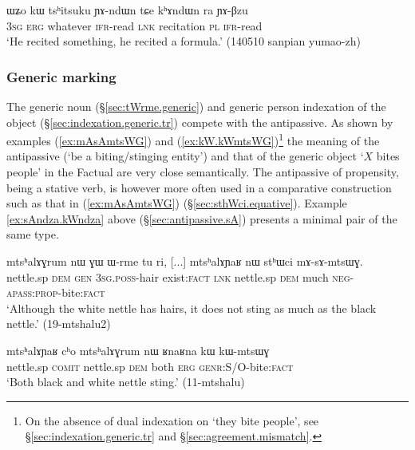 \begin{exe}
\ex \label{ex:tshitsuku.YAndWn}
\gll ɯʑo kɯ tsʰitsuku ɲɤ-ndɯn tɕe kʰɤndɯn ra ɲɤ-βzu \\
\textsc{3sg} \textsc{erg} whatever \textsc{ifr}-read \textsc{lnk} recitation \textsc{pl} \textsc{ifr}-read \\
\glt `He recited something, he recited a formula.' (140510 sanpian yumao-zh)
\end{exe}

\subsubsection{Generic marking  } \label{sec:antipassive.vs.generic}
The generic noun  (§\ref{sec:tWrme.generic}) and generic person indexation of the object (§\ref{sec:indexation.generic.tr}) compete with the  antipassive. As shown by examples (\ref{ex:mAsAmtsWG}) and (\ref{ex:kW.kWmtsWG})\footnote{On the absence of dual indexation on  `they bite people', see §\ref{sec:indexation.generic.tr} and §\ref{sec:agreement.mismatch}. } the meaning of the antipassive  (`be a biting/stinging entity') and that of the generic object  `$X$ bites people' in the Factual are very close semantically. The antipassive of propensity, being a stative verb, is however more often used in a comparative construction such as that in (\ref{ex:mAsAmtsWG}) (§\ref{sec:sthWci.equative}).  Example \ref{ex:sAndza.kWndza} above (§\ref{sec:antipassive.sA}) presents a minimal pair of the same type.
 
\begin{exe}
\ex \label{ex:mAsAmtsWG}
\gll mtsʰalɤɣrum nɯ ɣɯ ɯ-rme tu ri, [...] mtsʰalɤɲaʁ nɯ stʰɯci mɤ-sɤ-mtsɯɣ. \\
nettle.sp \textsc{dem} \textsc{gen} \textsc{3sg}.\textsc{poss}-hair exist:\textsc{fact} \textsc{lnk} { } nettle.sp \textsc{dem} much \textsc{neg}-\textsc{apass}:\textsc{prop}-bite:\textsc{fact} \\
\glt `Although the white nettle has hairs, it does not sting as much as the black nettle.' (19-mtshalu2) 
\end{exe}

\begin{exe}
\ex \label{ex:kW.kWmtsWG}
\gll  mtsʰalɤɲaʁ cʰo mtsʰalɤɣrum nɯ ʁnaʁna kɯ kɯ-mtsɯɣ \\
nettle.sp \textsc{comit} nettle.sp  \textsc{dem} both \textsc{erg} \textsc{genr}:S/O-bite:\textsc{fact} \\
\glt `Both black and white nettle sting.' (11-mtshalu)
\end{exe}

